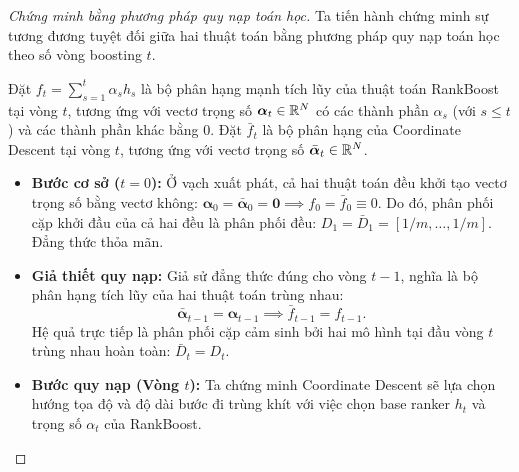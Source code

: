 \begin{proof}[Chứng minh bằng phương pháp quy nạp toán học]
Ta tiến hành chứng minh sự tương đương tuyệt đối giữa hai thuật toán bằng phương pháp quy nạp toán học theo số vòng boosting $t$.

Đặt $f_t = \sum_{s=1}^t \alpha_s h_s$ là bộ phân hạng mạnh tích lũy của thuật toán RankBoost tại vòng $t$, tương ứng với vectơ trọng số $\bm{\alpha}_t \in \mathbb{R}^N$ có các thành phần $\alpha_s$ (với $s \le t$) và các thành phần khác bằng $0$.
Đặt $\bar{f}_t$ là bộ phân hạng của Coordinate Descent tại vòng $t$, tương ứng với vectơ trọng số $\bar{\bm{\alpha}}_t \in \mathbb{R}^N$.

\begin{itemize}
    \item \textbf{Bước cơ sở ($t=0$):} Ở vạch xuất phát, cả hai thuật toán đều khởi tạo vectơ trọng số bằng vectơ không: $\bm{\alpha}_0 = \bar{\bm{\alpha}}_0 = \bm{0} \implies f_0 = \bar{f}_0 \equiv 0$. Do đó, phân phối cặp khởi đầu của cả hai đều là phân phối đều: $D_1 = \bar{D}_1 = [1/m, \dots, 1/m]$. Đẳng thức thỏa mãn.
    
    \item \textbf{Giả thiết quy nạp:} Giả sử đẳng thức đúng cho vòng $t-1$, nghĩa là bộ phân hạng tích lũy của hai thuật toán trùng nhau:
    \[
        \bar{\bm{\alpha}}_{t-1} = \bm{\alpha}_{t-1} \implies \bar{f}_{t-1} = f_{t-1}.
    \]
    Hệ quả trực tiếp là phân phối cặp cảm sinh bởi hai mô hình tại đầu vòng $t$ trùng nhau hoàn toàn: $\bar{D}_t = D_t$.
    
    \item \textbf{Bước quy nạp (Vòng $t$):} Ta chứng minh Coordinate Descent sẽ lựa chọn hướng tọa độ và độ dài bước đi trùng khít với việc chọn base ranker $h_t$ và trọng số $\alpha_t$ của RankBoost.
    

\end{itemize}
\end{proof}

